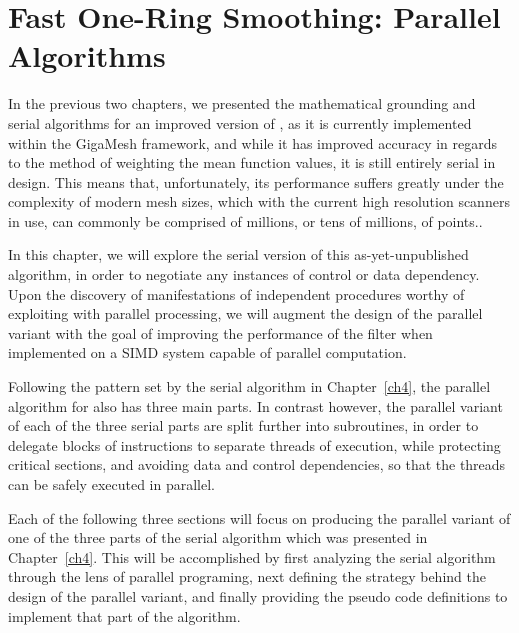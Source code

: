 \chapter{Fast One-Ring Smoothing: Parallel Algorithms}
\label{ch5}
In the previous two chapters, we presented the mathematical grounding and serial algorithms for an improved version of , as it is currently implemented within the GigaMesh framework, and while it has improved accuracy in regards to the method of weighting the mean function values, it is still entirely serial in design. This means that, unfortunately, its performance suffers greatly under the complexity of modern mesh sizes, which with the current high resolution scanners in use, can commonly be comprised of millions, or tens of millions, of points..

In this chapter, we will explore the serial version of this as-yet-unpublished algorithm, in order to negotiate any instances of control or data dependency. Upon the discovery of manifestations of independent procedures worthy of exploiting with parallel processing, we will augment the design of the parallel variant with the goal of improving the performance of the filter when implemented on a \gls{SIMD} system capable of parallel computation.

Following the pattern set by the serial algorithm in Chapter~\ref{ch4}, the parallel algorithm for  also has three main parts. In contrast however, the parallel variant of each of the three serial parts are split further into subroutines, in order to delegate blocks of instructions to separate threads of execution, while protecting critical sections, and avoiding data and control dependencies, so that the threads can be safely executed in parallel.

Each of the following three sections will focus on producing the parallel variant of one of the three parts of the serial algorithm which was presented in Chapter~\ref{ch4}. This will be accomplished by first analyzing the serial algorithm through the lens of parallel programing, next defining the strategy behind the design of the parallel variant, and finally providing the pseudo code definitions to implement that part of the algorithm.

%
%
%
%
